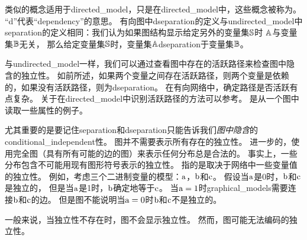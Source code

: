 类似的概念适用于\gls{directed_model}，只是在\gls{directed_model}中，这些概念被称为。
``d''代表``\gls{dependency}''的意思。
有向图中\gls{dseparation}的定义与\gls{undirected_model}中\gls{separation}的定义相同：我们认为如果图结构显示给定另外的变量集$\mathbb{S}$时 $\mathbb{A}$与变量集$\mathbb{B}$无关，
那么给定变量集$\mathbb{S}$时，变量集$\mathbb{A}$\gls{dseparation}于变量集$\mathbb{B}$。%


与\gls{undirected_model}一样，我们可以通过查看图中存在的活跃路径来检查图中隐含的独立性。
如前所述，如果两个变量之间存在活跃路径，则两个变量是依赖的，如果没有活跃路径，则为\gls{dseparation}。
在有向网络中，确定路径是否活跃有点复杂。
关于在\gls{directed_model}中识别活跃路径的方法可以参考。 
是从一个图中读取一些属性的例子。





尤其重要的是要记住\gls{separation}和\gls{dseparation}只能告诉我们\emph{图中隐含}的\gls{conditional_independent}性。
图并不需要表示所有存在的独立性。 
进一步的，使用完全图（具有所有可能的边的图）来表示任何分布总是合法的。
事实上，一些分布包含不可能用现有图形符号表示的独立性。
指的是取决于网络中一些变量值的独立性。
例如，考虑三个二进制变量的模型：$\mathrm{a}$，$\mathrm{b} $和$\mathrm{c}$。
假设当$\mathrm{a}$是0时，$\mathrm{b}$和$\mathrm{c}$是独立的， 但是当$\mathrm{a}$是1时，$\mathrm{b}$确定地等于$\mathrm{c}$。
当$\mathrm{a} = 1$时\gls{graphical_models}需要连接$\mathrm{b}$和$\mathrm{c}$的边。
但是图不能说明当$\mathrm{a} = 0$时$\mathrm{b}$和$\mathrm{c}$不是独立的。

一般来说，当独立性不存在时，图不会显示独立性。 
然而，图可能无法编码的独立性。



